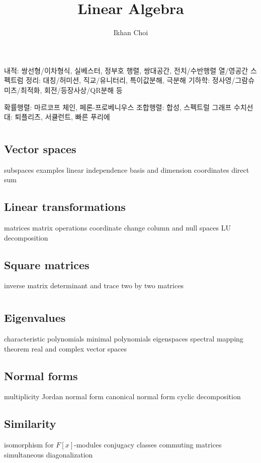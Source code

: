\documentclass{../../large}
\begin{document}
\title{Linear Algebra}
\author{Ikhan Choi}
\maketitle
\tableofcontents





내적: 쌍선형/이차형식, 실베스터, 정부호 행렬, 쌍대공간, 전치/수반행렬 열/영공간
스펙트럼 정리: 대칭/허미션, 직교/유니터리, 특이값분해, 극분해
기하학: 정사영/그람슈미츠/최적화, 회전/등장사상/QR분해 등

확률행렬: 마르코프 체인, 페론-프로베니우스
조합행렬: 합성, 스펙트럴 그래프
수치선대: 퇴플리츠, 서큘런트, 빠른 푸리에


\part{}
\chapter{Vector spaces}
subspaces
examples
linear independence
basis and dimension
coordinates
direct sum

\chapter{Linear transformations}
matrices
matrix operations
coordinate change
column and null spaces
LU decomposition

\chapter{Square matrices}
inverse matrix
determinant and trace
two by two matrices

\part{}
\chapter{Eigenvalues}
characteristic polynomials
minimal polynomials
eigenspaces
spectral mapping theorem
real and complex vector spaces

\chapter{Normal forms}
multiplicity
Jordan normal form
canonical normal form
cyclic decomposition

\chapter{Similarity}
isomorphism for $F[x]$-modules
conjugacy classes
commuting matrices
simultaneous diagonalization

\part{}

\part{}
\end{document}
